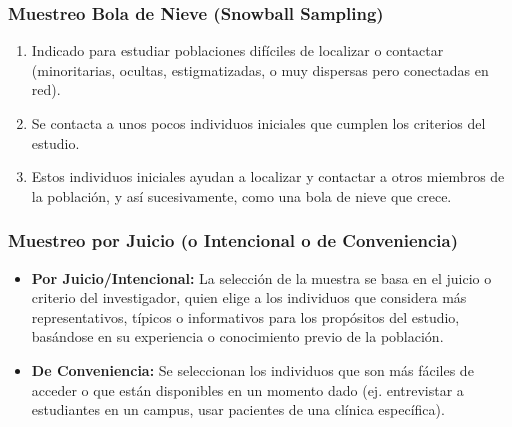 \documentclass[12pt, letterpaper]{article}
\begin{document}
\subsubsection{Muestreo Bola de Nieve (Snowball Sampling)}
\begin{enumerate}
    \item Indicado para estudiar poblaciones difíciles de localizar o contactar (minoritarias, ocultas, estigmatizadas, o muy dispersas pero conectadas en red).
    \item Se contacta a unos pocos individuos iniciales que cumplen los criterios del estudio.
    \item Estos individuos iniciales ayudan a localizar y contactar a otros miembros de la población, y así sucesivamente, como una bola de nieve que crece.
\end{enumerate}

\subsubsection{Muestreo por Juicio (o Intencional o de Conveniencia)}
\begin{itemize}
    \item \textbf{Por Juicio/Intencional:} La selección de la muestra se basa en el juicio o criterio del investigador, quien elige a los individuos que considera más representativos, típicos o informativos para los propósitos del estudio, basándose en su experiencia o conocimiento previo de la población.
    \item \textbf{De Conveniencia:} Se seleccionan los individuos que son más fáciles de acceder o que están disponibles en un momento dado (ej. entrevistar a estudiantes en un campus, usar pacientes de una clínica específica).
\end{itemize}
\end{document}
